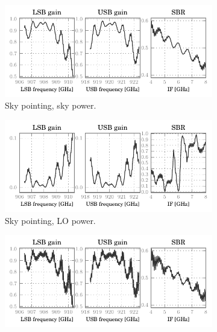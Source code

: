 \begin{figure}[p]
    \centering
    \begin{subfigure}[b]{\textwidth}
        \centering
        \includegraphics[scale=.9]{87_00_00_sky_s_lsbusbsbr}
        \vspace{-.8em}
        \caption{Sky pointing, sky power.}
        \label{fig:lsbusbsbr_skysky}
    \end{subfigure}
    \begin{subfigure}[b]{\textwidth}
        \centering
        \includegraphics[scale=.9]{87_00_00_sky_l_lsbusbsbr}
        \vspace{-.8em}
        \caption{Sky pointing, LO power.}
        \label{fig:lsbusbsbr_skylo}
    \end{subfigure}
    \begin{subfigure}[b]{\textwidth}
        \centering
        \includegraphics[scale=.9]{87_00_00_hbb_s_lsbusbsbr}

\end{subfigure}
\end{figure}
